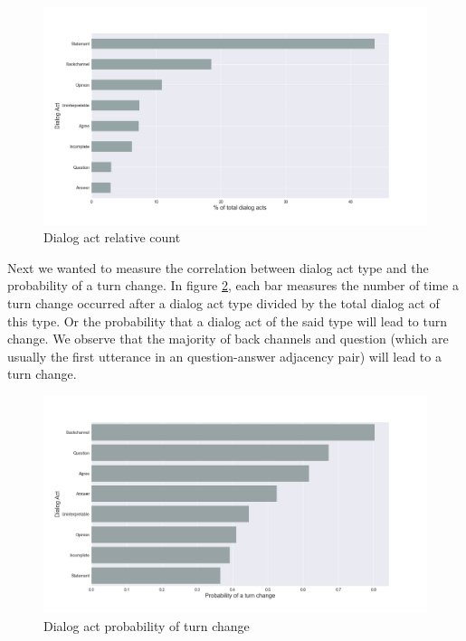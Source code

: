  \begin{figure}[ht!]
 \centering
 \includegraphics[width=\textwidth]{../scikitlearn/figures/f1.png}
 \caption{Dialog act relative count\label{overflow}}
 \label{f1}
 \end{figure}

Next we wanted to measure the correlation between dialog act type and the probability of a turn change.  In figure \ref{f2}, each bar measures the number of time a turn change occurred after a dialog act type divided by the total dialog act of this type. Or the probability that a dialog act of the said type will lead to turn change. We observe that the majority of back channels and question (which are usually the first utterance in an question-answer adjacency pair) will lead to a turn change.

\begin{figure}[ht!]
\centering
\includegraphics[width=\textwidth]{../scikitlearn/figures/f2.png}
\caption{Dialog act probability of turn change\label{overflow}}
\label{f2}
\end{figure}
\pagebreak 